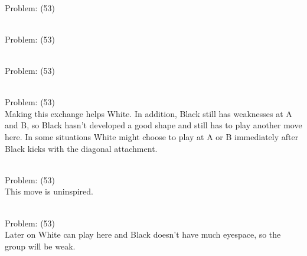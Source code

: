 \documentclass[11pt]{article}
\begin{document}
\begin{minipage}[t]{0.5\textwidth}
  {\centering
  
\\
Problem: (53)\\
  }
\end{minipage}
\begin{minipage}[t]{0.5\textwidth}
  {\centering
  
\\
Problem: (53)\\
  }
\end{minipage}
\begin{minipage}[t]{0.5\textwidth}
  {\centering
  
\\
Problem: (53)\\
  }
\end{minipage}
\begin{minipage}[t]{0.5\textwidth}
  {\centering
  
\\
Problem: (53)\\
Making this exchange helps White. In addition, Black still has weaknesses at A and B, so Black hasn't developed a good shape and still has to play another move here. In some situations White might choose to play at A or B immediately after Black kicks with the diagonal attachment.\\
  }
\end{minipage}
\begin{minipage}[t]{0.5\textwidth}
  {\centering
  
\\
Problem: (53)\\
This move is uninspired.\\
  }
\end{minipage}
\begin{minipage}[t]{0.5\textwidth}
  {\centering
  
\\
Problem: (53)\\
Later on White can play here and Black doesn't have much eyespace, so the group will be weak.\\
  }
\end{minipage}
\end{document}
